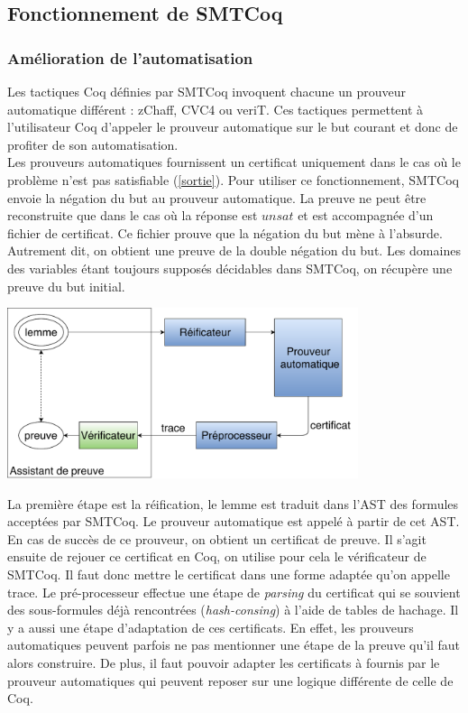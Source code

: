 \documentclass[11pt]{article}
\begin{document}
\subsection{Fonctionnement de SMTCoq}

\subsubsection{Amélioration de l'automatisation}\label{negation}

Les tactiques Coq définies par SMTCoq invoquent chacune un prouveur automatique différent : zChaff, CVC4 ou veriT. Ces tactiques permettent à l'utilisateur Coq d'appeler le prouveur automatique sur le but courant et donc de profiter de son automatisation. \\

Les prouveurs automatiques fournissent un certificat uniquement dans le cas où le problème n'est pas satisfiable (\ref{sortie}). Pour utiliser ce fonctionnement, SMTCoq envoie la négation du but au prouveur automatique. La preuve ne peut être reconstruite que dans le cas où la réponse est $unsat$ et est accompagnée d'un fichier de certificat. Ce fichier prouve que la négation du but mène à l'absurde. Autrement dit, on obtient une preuve de la double négation du but. Les domaines des variables étant toujours supposés décidables dans SMTCoq, on récupère une preuve du but initial.

\begin{center}
    \includegraphics[height=5cm]{Automatisation.pdf}
\end{center}

La première étape est la réification, le lemme est traduit dans l'AST des formules acceptées par SMTCoq. Le prouveur automatique est appelé à partir de cet AST. En cas de succès de ce prouveur, on obtient un certificat de preuve. 
Il s'agit ensuite de rejouer ce certificat en Coq, on utilise pour cela le vérificateur de SMTCoq. Il faut donc mettre le certificat dans une forme adaptée qu'on appelle trace. Le pré-processeur effectue une étape de \textit{parsing} du certificat qui se souvient des sous-formules déjà rencontrées (\textit{hash-consing}) à l'aide de tables de hachage.  Il y a aussi une étape d'adaptation de ces certificats. En effet, les prouveurs automatiques peuvent parfois ne pas mentionner une étape de la preuve qu'il faut alors construire. De plus, il faut pouvoir adapter les certificats à fournis par le prouveur automatiques qui peuvent reposer sur une logique différente de celle de Coq. \\
\end{document}
